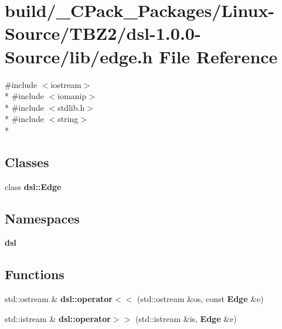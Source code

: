 \section{build/\-\_\-\-C\-Pack\-\_\-\-Packages/\-Linux-\/\-Source/\-T\-B\-Z2/dsl-\/1.0.0-\/\-Source/lib/edge.h File Reference}
\label{build_2__CPack__Packages_2Linux-Source_2TBZ2_2dsl-1_80_80-Source_2lib_2edge_8h}
{\ttfamily \#include $<$iostream$>$}\\*
{\ttfamily \#include $<$iomanip$>$}\\*
{\ttfamily \#include $<$stdlib.\-h$>$}\\*
{\ttfamily \#include $<$string$>$}\\*
\subsection*{Classes}
\begin{DoxyCompactItemize}
\item 
class {\bf dsl\-::\-Edge}
\end{DoxyCompactItemize}
\subsection*{Namespaces}
\begin{DoxyCompactItemize}
\item 
{\bf dsl}
\end{DoxyCompactItemize}
\subsection*{Functions}
\begin{DoxyCompactItemize}
\item 
std\-::ostream \& {\bf dsl\-::operator$<$$<$} (std\-::ostream \&os, const {\bf Edge} \&e)
\item 
std\-::istream \& {\bf dsl\-::operator$>$$>$} (std\-::istream \&is, {\bf Edge} \&e)
\end{DoxyCompactItemize}
